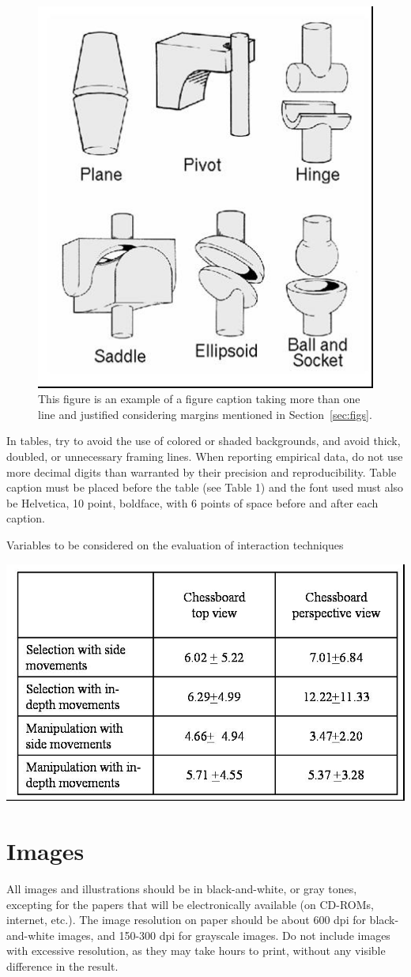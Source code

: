 \documentclass[12pt]{article}
\begin{document}
\begin{figure}[ht]
\centering
\includegraphics[width=.3\textwidth]{fig2.jpg}
\caption{This figure is an example of a figure caption taking more than one
  line and justified considering margins mentioned in Section~\ref{sec:figs}.}
\label{fig:exampleFig2}
\end{figure}

In tables, try to avoid the use of colored or shaded backgrounds, and avoid
thick, doubled, or unnecessary framing lines. When reporting empirical data,
do not use more decimal digits than warranted by their precision and
reproducibility. Table caption must be placed before the table (see Table 1)
and the font used must also be Helvetica, 10 point, boldface, with 6 points of
space before and after each caption.

\begin{table}[ht]
\centering
\caption{Variables to be considered on the evaluation of interaction
  techniques}
\label{tab:exTable1}
\includegraphics[width=.7\textwidth]{table.jpg}
\end{table}


\section{Images}

All images and illustrations should be in black-and-white, or gray tones,
excepting for the papers that will be electronically available (on CD-ROMs,
internet, etc.). The image resolution on paper should be about 600 dpi for
black-and-white images, and 150-300 dpi for grayscale images.  Do not include
images with excessive resolution, as they may take hours to print, without any
visible difference in the result. 
\end{document}
